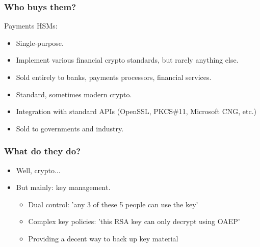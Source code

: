 \documentclass{beamer}
\begin{document}
\frame
{
  \frametitle{Who buys them?}

  Payments HSMs:
  
  \begin{itemize}
    \item<1-> Single-purpose.
    \item<2-> Implement various financial crypto standards, but rarely anything else.
    \item<3-> Sold entirely to banks, payments processors, financial services.
  \end{itemize}


  \begin{itemize}
    \item<4-> Standard, sometimes modern crypto.
    \item<5-> Integration with standard APIs (OpenSSL, PKCS\#11, Microsoft CNG, etc.)
    \item<6-> Sold to governments and industry.
  \end{itemize}
}

\frame
{
  \frametitle{What do they do?}

  \begin{itemize}
    \item<1-> Well, crypto...
    \item<2-> But mainly: key management.  
      \begin{itemize}
        \item<3-> Dual control: 'any 3 of these 5 people can use the key'
        \item<4-> Complex key policies: 'this RSA key can only decrypt using OAEP'
        \item<5-> Providing a decent way to back up key material
      \end{itemize}
  \end{itemize}
}
\end{document}
